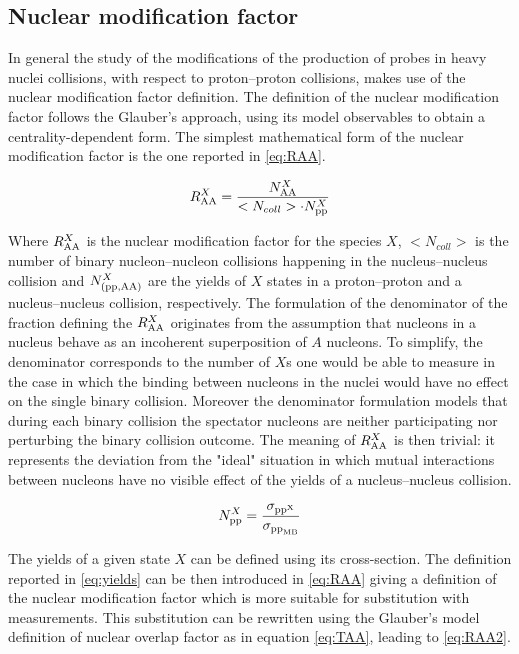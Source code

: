 \subsection{Nuclear modification factor}\label{RAA}
In general the study of the modifications of the production of probes in heavy nuclei collisions, with respect to proton--proton collisions, makes use of the nuclear modification factor definition.
The definition of the nuclear modification factor follows the Glauber's approach, using its model observables to obtain a centrality-dependent form.
The simplest mathematical form of the nuclear modification factor is the one reported in \ref{eq:RAA}.

\begin{equation}[!t]
\label{eq:RAA}
R_{\rm{AA}}^X = \frac{N_{\rm{AA}}^X}{<N_{coll}>\cdot N_{\rm{pp}}^X}
\end{equation}

Where $R_{\rm{AA}}^X$ is the nuclear modification factor for the species $X$, $<N_{coll}>$ is the number of binary nucleon--nucleon collisions happening in the nucleus--nucleus collision and $N_{\rm{(pp,AA)}}^X$ are the yields of $X$ states in a proton--proton and a nucleus--nucleus collision, respectively.
The formulation of the denominator of the fraction defining the $R_{\rm{AA}}^X$ originates from the assumption that nucleons in a nucleus behave as an incoherent superposition of $A$ nucleons.
To simplify, the denominator corresponds to the number of $X$s one would be able to measure in the case in which the binding between nucleons in the nuclei would have no effect on the single binary collision.
Moreover the denominator formulation models that during each binary collision the spectator nucleons are neither participating nor perturbing the binary collision outcome.
The meaning of $R_{\rm{AA}}^X$ is then trivial: it represents the deviation from the "ideal" situation in which mutual interactions between nucleons have no visible effect of the yields of a nucleus--nucleus collision.

\begin{equation}
\label{eq:yields}
N_{\rm{pp}}^X = \frac{\sigma_{\rm{pp}^{X}}}{\sigma_{\rm{pp}_{MB}}}
\end{equation}

The yields of a given state $X$ can be defined using its cross-section. The definition reported in \ref{eq:yields} can be then introduced in \ref{eq:RAA} giving a definition of the nuclear modification factor which is more suitable for substitution with measurements. This substitution can be rewritten using the Glauber's model definition of nuclear overlap factor as in equation \ref{eq:TAA}, leading to \ref{eq:RAA2}.

